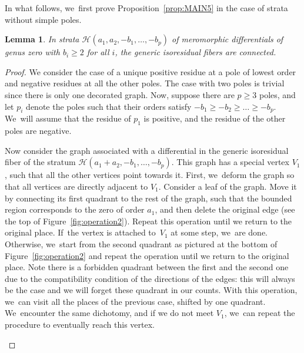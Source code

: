 \documentclass[JEP,XML,SOM,Unicode,NoFloatCountersInSection,published]{cedram}
\newcommand\calH{{\mathcal H}}
\newtheorem{lem}[thm]{Lemma}
\theoremstyle{definition}
\begin{document}
In what follows, we~first prove Proposition~\ref{prop:MAIN5} in the case of strata without simple poles.
\begin{lem}\label{lem:MAIN5nosimple}
In strata $\calH(a_{1},a_{2},-b_{1},\dots,-b_{p})$ of meromorphic differentials of genus zero with $b_{i}\geq2$ for all $i$, the generic isoresidual fibers are connected.
\end{lem}
\begin{proof}
We consider the case of a unique positive residue at a pole of lowest order and negative residues at all the other poles. The case with two poles is trivial since there is only one decorated graph. Now, suppose there are $p\geq3$ poles, and let $p_i$ denote the poles such that their orders satisfy $-b_{1}\geq -b_{2}\geq \dots \geq -b_{p}$. We~will assume that the residue of $p_{1}$ is positive, and the residue of the other poles are negative.

Now consider the graph associated with a differential in the generic isoresidual fiber of the stratum $\calH(a_{1}+a_{2},-b_{1},\dots,-b_{p})$. This graph has a special vertex $V_{1}$, such that all the other vertices point towards it. First, we~deform the graph so that all vertices are directly adjacent to $V_{1}$. Consider a leaf of the graph. Move it by connecting its first quadrant to the rest of the graph, such that the bounded region corresponds to the zero of order $a_{1}$, and then delete the original edge (see the top of Figure~\ref{fig:operation2}). Repeat this operation until we return to the original place. If~the vertex is attached to~$V_{1}$ at some step, we~are done. Otherwise, we~start from the second quadrant as pictured at the bottom of Figure~\ref{fig:operation2} and repeat the operation until we return to the original place. Note there is a forbidden quadrant between the first and the second one due to the compatibility condition of the directions of the edges: this will always be the case and we will forget these quadrant in our counts. With this operation, we~can visit all the places of the previous case, shifted by one quadrant. We~encounter the same dichotomy, and if we do not meet $V_{1}$, we~can repeat the procedure to eventually reach this vertex.
\begin{figure}[ht]
\end{figure}
\end{proof}
\end{document}

